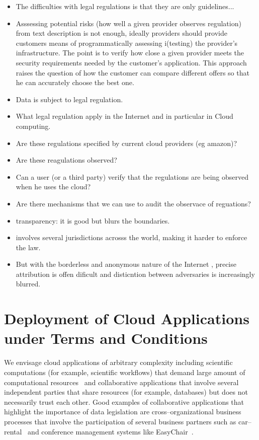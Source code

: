 \documentclass[runningheads,a4paper]{llncs}
\begin{document}
\begin{itemize}

 \item The difficulties with legal regulations is that they are only guidelines...
 \item Asssessing potential risks (how well a given provider observes regulation) from text
       description is not enough, ideally providers should provide customers means of
       programmatically assessing i(testing) the provider's infrastructure.
      The point is to verify how close a given provider meets the security requirements 
      needed by the customer's application. 
      This approach raises the question of how the customer can compare 
      different offers so that he can accurately choose the best one.

 \item  Data is subject to legal regulation.
 \item  What legal regulation apply in the Internet and in particular in Cloud computing.
 \item  Are these regulations specified by current cloud providers (eg amazon)?
 \item  Are these reagulations observed?
 \item  Can a user (or a third party) verify that the regulations are being observed when he
        uses the cloud?
 \item  Are there mechanisms that we can use to audit the observace of reguations?

 \item transparency: it is good but blurs the boundaries.
 \item involves several jurisdictions acrosss the world, making it harder to enforce the law.
 \item But with the borderless and anonymous nature of the Internet , precise
       attribution is offen dificult and disticntion between adversaries is
       increasingly blurred.
\end{itemize}

\section{Deployment of Cloud Applications under Terms and Conditions}
We envisage cloud applications of arbitrary complexity including  
scientific computations (for example, scientific workflows) that demand large amount 
of computational resources~\cite{Vecchiola2009,Deelman2008} and
collaborative applications that involve several independent
parties that share resources (for example, databases) but
does not necessarily trust each other.
Good examples of collaborative applications that highlight the
importance of data legislation are cross--organizational
business processes that involve the participation of several business 
partners such as car--rental~\cite{Aalst2011} and conference management systems like
EasyChair~\cite{Ryan2011}.
\end{document}
